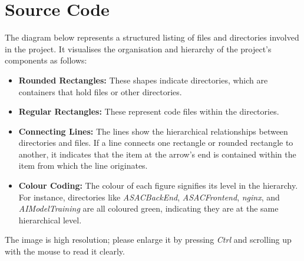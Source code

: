 \chapter{Source Code}

The diagram below represents a structured listing of files and directories involved in the project. It visualises the organisation and hierarchy of the project's components as follows:
\begin{itemize}
    \item \textbf{Rounded Rectangles:} These shapes indicate directories, which are containers that hold files or other directories.
    \item \textbf{Regular Rectangles:} These represent code files within the directories.
    \item \textbf{Connecting Lines:} The lines show the hierarchical relationships between directories and files. If a line connects one rectangle or rounded rectangle to another, it indicates that the item at the arrow's end is contained within the item from which the line originates.
    \item \textbf{Colour Coding:} The colour of each figure signifies its level in the hierarchy. For instance, directories like \textit{ASACBackEnd}, \textit{ASACFrontend}, \textit{nginx}, and \textit{AIModelTraining} are all coloured green, indicating they are at the same hierarchical level.
\end{itemize}

The image is high resolution; please enlarge it by pressing \textit{Ctrl} and scrolling up with the mouse to read it clearly.

